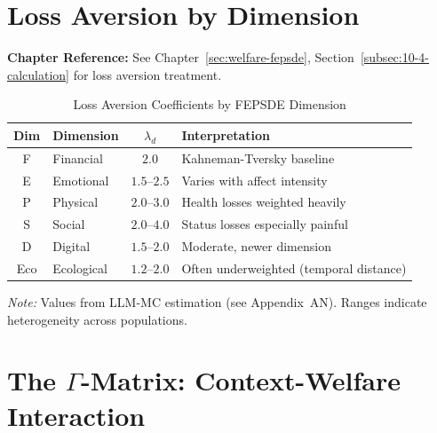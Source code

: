 \section{Loss Aversion by Dimension}
\label{sec:app-c-loss-aversion}

\begin{cross-reference}
\textbf{Chapter Reference:} See Chapter~\ref{sec:welfare-fepsde}, 
Section~\ref{subsec:10-4-calculation} for loss aversion treatment.
\end{cross-reference}

\begin{table}[htbp]
\centering
\caption{Loss Aversion Coefficients by FEPSDE Dimension}
\label{tab:app-c-lambda}
\renewcommand{\arraystretch}{1.4}
\begin{tabular}{@{}clcl@{}}
\toprule
\textbf{Dim} & \textbf{Dimension} & \textbf{$\lambda_d$} & \textbf{Interpretation} \\
\midrule
F & Financial & $2.0$ & Kahneman-Tversky baseline \\
E & Emotional & $1.5$--$2.5$ & Varies with affect intensity \\
P & Physical & $2.0$--$3.0$ & Health losses weighted heavily \\
S & Social & $2.0$--$4.0$ & Status losses especially painful \\
D & Digital & $1.5$--$2.0$ & Moderate, newer dimension \\
Eco & Ecological & $1.2$--$2.0$ & Often underweighted (temporal distance) \\
\bottomrule
\end{tabular}
\begin{flushleft}
\small\textit{Note:} Values from LLM-MC estimation (see Appendix~AN). 
Ranges indicate heterogeneity across populations.
\end{flushleft}
\end{table}

\section{The $\Gamma$-Matrix: Context-Welfare Interaction}
\label{sec:app-c-gamma}

